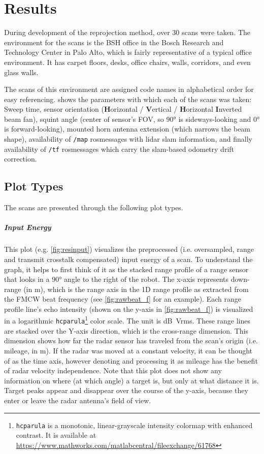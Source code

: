\section{Results}\label{results}

During development of the reprojection method, over 30 scans were taken. The environment for the scans is the BSH office in the Bosch Research and Technology Center in Palo Alto, which is fairly representative of a typical office environment. It has carpet floors, desks, office chairs, walls, corridors, and even glass walls.

The scans of this environment are assigned code names in alphabetical order for easy referencing.  shows the parameters with which each of the scans was taken: Sweep time, sensor orientation (\textbf{H}orizontal / \textbf{V}ertical / \textbf{H}orizontal \textbf{I}nverted beam fan), squint angle (center of sensor's FOV, so \ang{90} is sideways-looking and \ang{0} is forward-looking), mounted horn antenna extension (which narrows the beam shape), availability of \texttt{/map} rosmessages with lidar slam information, and finally availability of \texttt{/tf} rosmessages which carry the slam-based odometry drift correction.

\subsection{Plot Types}
The scans are presented through the following plot types.

\subparagraph{Input Energy}
This plot (e.g. \cref{fig:resinput}) visualizes the preprocessed (i.e. oversampled, range and transmit crosstalk compensated) input energy of a scan. To understand the graph, it helps to first think of it as the stacked range profile of a range sensor that looks in a \ang{90} angle to the right of the robot. The x-axis represents down-range (in \si{m}), which is the range axis in the 1D range profile as extracted from the FMCW beat frequency (see \cref{fig:rawbeat_f} for an example). Each range profile line's echo intensity (shown on the y-axis in \cref{fig:rawbeat_f}) is visualized in a logarithmic \texttt{hcparula}\footnote{\texttt{hcparula} is a monotonic, linear-grayscale intensity colormap with enhanced contrast. It is available at \url{https://www.mathworks.com/matlabcentral/fileexchange/61768}} color scale. The unit is \si{dB Vrms}. These range lines are stacked over the Y-axis direction, which is the cross-range dimension. This dimension shows how far the radar sensor has traveled from the scan's origin (i.e. mileage, in \si{m}). If the radar was moved at a constant velocity, it can be thought of as the time axis, however denoting and processing it as mileage has the benefit of radar velocity independence. Note that this plot does not show any information on where (at which angle) a target is, but only at what distance it is. Target peaks appear and disappear over the course of the y-axis, because they enter or leave the radar antenna's field of view.

